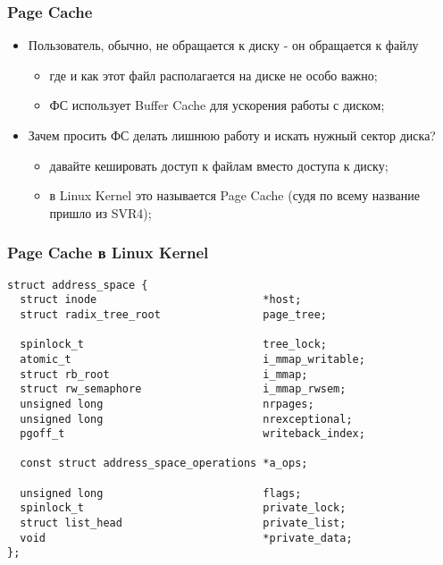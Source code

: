\begin{frame}
\frametitle{Page Cache}
\begin{itemize}
  \item<1-> Пользователь, обычно, не обращается к диску - он обращается к файлу
    \begin{itemize}
      \item где и как этот файл располагается на диске не особо важно;
      \item ФС использует Buffer Cache для ускорения работы с диском;
    \end{itemize}
  \item<2-> Зачем просить ФС делать лишнюю работу и искать нужный сектор диска?
    \begin{itemize}
      \item давайте кешировать доступ к файлам вместо доступа к диску;
      \item в Linux Kernel это называется Page Cache (судя по всему название
            пришло из SVR4);
    \end{itemize}
\end{itemize}
\end{frame}

\begin{frame}[fragile]
\frametitle{Page Cache в Linux Kernel}
\begin{lstlisting}
struct address_space {
  struct inode                          *host;
  struct radix_tree_root                page_tree;

  spinlock_t                            tree_lock;
  atomic_t                              i_mmap_writable;
  struct rb_root                        i_mmap;
  struct rw_semaphore                   i_mmap_rwsem;
  unsigned long                         nrpages;
  unsigned long                         nrexceptional;
  pgoff_t                               writeback_index;

  const struct address_space_operations *a_ops;

  unsigned long                         flags;
  spinlock_t                            private_lock;
  struct list_head                      private_list;
  void                                  *private_data;
};
\end{lstlisting}
\end{frame}

